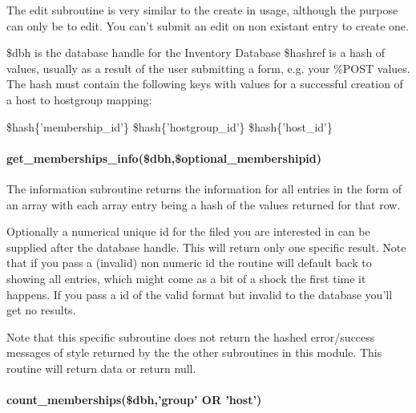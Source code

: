 \documentclass{book}
\begin{document}
The edit subroutine is very similar to the create in usage, although the purpose can only be to edit. You can't submit an edit on non existant entry to create one.



\$dbh is the database handle for the Inventory Database \$hashref is a hash of values, usually as a result of the user submitting a form, e.g. your \%POST values. The hash must contain the following keys with values for a successful creation of a host to hostgroup mapping:



\$hash\{'membership\_id'\} \$hash\{'hostgroup\_id'\} \$hash\{'host\_id'\}


\paragraph*{get\protect\_memberships\protect\_info(\$dbh,\$optional\protect\_membershipid)}
\label{Inventory::Memberships_get_memberships_info_dbh_optional_membershipid_}
\hypertarget{Inventory::Memberships_get_memberships_info_dbh_optional_membershipid_}{}



The information subroutine returns the information for all entries in the form of an array with each array entry being a hash of the values returned for that row.



Optionally a numerical unique id for the filed you are interested in can be supplied after the database handle. This will return only one specific result. Note that if you pass a (invalid) non numeric id the routine will default back to showing all entries, which might come as a bit of a shock the first time it happens. If you pass a id of the valid format but invalid to the database you'll get no results.



Note that this specific subroutine does not return the hashed error/success messages of style returned by the the other subroutines in this module. This routine will return data or return null.


\paragraph*{count\protect\_memberships(\$dbh,'group' OR 'host')}
\label{Inventory::Memberships_count_memberships_dbh_group_OR_host_}
\hypertarget{Inventory::Memberships_count_memberships_dbh_group_OR_host_}{}
\end{document}
